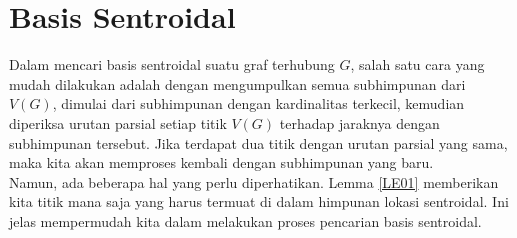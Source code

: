 \section{Basis Sentroidal}
Dalam mencari basis sentroidal suatu graf terhubung $G$, salah satu cara yang mudah dilakukan adalah dengan mengumpulkan semua subhimpunan dari $V(G)$, dimulai dari subhimpunan dengan kardinalitas terkecil, kemudian diperiksa urutan parsial setiap titik $V(G)$ terhadap jaraknya dengan subhimpunan tersebut. Jika terdapat dua titik dengan urutan parsial yang sama, maka kita akan memproses kembali dengan subhimpunan yang baru.\\
Namun, ada beberapa hal yang perlu diperhatikan. Lemma \ref{LE01} memberikan kita titik mana saja yang harus termuat di dalam himpunan lokasi sentroidal. Ini jelas mempermudah kita dalam melakukan proses pencarian basis sentroidal. 
\vspace{-\topsep}
